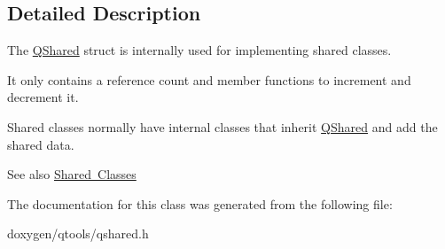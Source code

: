 \subsection{Detailed Description}
The \mbox{\hyperlink{struct_q_shared}{Q\+Shared}} struct is internally used for implementing shared classes. 

It only contains a reference count and member functions to increment and decrement it.

Shared classes normally have internal classes that inherit \mbox{\hyperlink{struct_q_shared}{Q\+Shared}} and add the shared data.

\begin{DoxySeeAlso}{See also}
\mbox{\hyperlink{}{Shared Classes}} 
\end{DoxySeeAlso}


The documentation for this class was generated from the following file\+:\begin{DoxyCompactItemize}
\item 
doxygen/qtools/qshared.\+h\end{DoxyCompactItemize}
